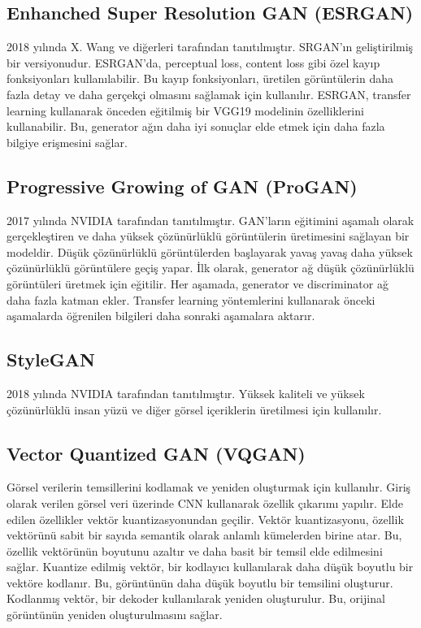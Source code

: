 \newpage

\subsection{Enhanched Super Resolution GAN (ESRGAN)}
2018 yılında X. Wang ve diğerleri tarafından tanıtılmıştır. SRGAN'ın geliştirilmiş bir versiyonudur. ESRGAN'da, perceptual loss, content loss gibi özel kayıp fonksiyonları kullanılabilir. Bu kayıp fonksiyonları, üretilen görüntülerin daha fazla detay ve daha gerçekçi olmasını sağlamak için kullanılır. ESRGAN, transfer learning kullanarak önceden eğitilmiş bir VGG19 modelinin özelliklerini kullanabilir. Bu, generator ağın daha iyi sonuçlar elde etmek için daha fazla bilgiye erişmesini sağlar.

\newpage

\subsection{Progressive Growing of GAN (ProGAN)}
2017 yılında NVIDIA tarafından tanıtılmıştır. GAN'ların eğitimini aşamalı olarak gerçekleştiren ve daha yüksek çözünürlüklü görüntülerin üretimesini sağlayan bir modeldir. Düşük çözünürlüklü görüntülerden başlayarak yavaş yavaş daha yüksek çözünürlüklü görüntülere geçiş yapar. İlk olarak, generator ağ düşük çözünürlüklü görüntüleri üretmek için eğitilir. Her aşamada, generator ve discriminator ağ daha fazla katman ekler. Transfer learning yöntemlerini kullanarak önceki aşamalarda öğrenilen bilgileri daha sonraki aşamalara aktarır.

\newpage

\subsection{StyleGAN}
2018 yılında NVIDIA tarafından tanıtılmıştır. Yüksek kaliteli ve yüksek çözünürlüklü insan yüzü ve diğer görsel içeriklerin üretilmesi için kullanılır.

\newpage

\subsection{Vector Quantized GAN (VQGAN)}
Görsel verilerin temsillerini kodlamak ve yeniden oluşturmak için kullanılır. Giriş olarak verilen görsel veri üzerinde CNN kullanarak özellik çıkarımı yapılır. Elde edilen özellikler vektör kuantizasyonundan geçilir. Vektör kuantizasyonu, özellik vektörünü sabit bir sayıda semantik olarak anlamlı kümelerden birine atar. Bu, özellik vektörünün boyutunu azaltır ve daha basit bir temsil elde edilmesini sağlar. Kuantize edilmiş vektör, bir kodlayıcı kullanılarak daha düşük boyutlu bir vektöre kodlanır. Bu, görüntünün daha düşük boyutlu bir temsilini oluşturur. Kodlanmış vektör, bir dekoder kullanılarak yeniden oluşturulur. Bu, orijinal görüntünün yeniden oluşturulmasını sağlar. 

